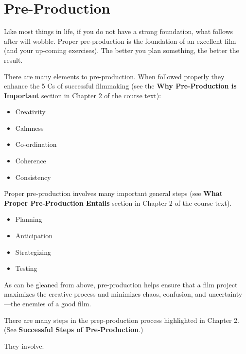 \documentclass[
]{book}
\providecommand{\tightlist}{%
  \setlength{\itemsep}{0pt}\setlength{\parskip}{0pt}}
\begin{document}
\hypertarget{pre-production}{%
\section*{Pre-Production}\label{pre-production}}

Like most things in life, if you do not have a strong foundation, what follows after will wobble. Proper pre-production is the foundation of an excellent film (and your up-coming exercises). The better you plan something, the better the result.

There are many elements to pre-production. When followed properly they enhance the 5 Cs of successful filmmaking (see the \textbf{Why Pre-Production is Important} section in Chapter 2 of the course text):

\begin{itemize}
\tightlist
\item
  Creativity\\
\item
  Calmness\\
\item
  Co-ordination\\
\item
  Coherence\\
\item
  Consistency
\end{itemize}

Proper pre-production involves many important general steps (see \textbf{What Proper Pre-Production Entails} section in Chapter 2 of the course text).

\begin{itemize}
\tightlist
\item
  Planning\\
\item
  Anticipation\\
\item
  Strategizing\\
\item
  Testing
\end{itemize}

As can be gleaned from above, pre-production helps ensure that a film project maximizes the creative process and minimizes chaos, confusion, and uncertainty---the enemies of a good film.

There are many steps in the prep-production process highlighted in Chapter 2. (See \textbf{Successful Steps of Pre-Production}.)

They involve:
\end{document}
